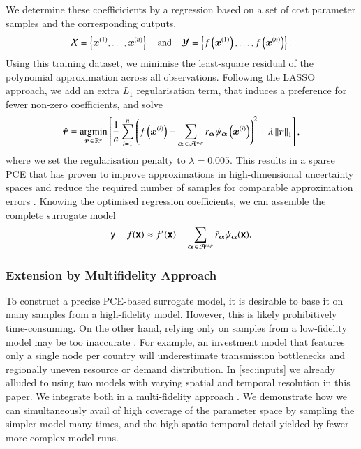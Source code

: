 We determine these coefficicients by a regression based on
a set of cost parameter samples
and the corresponding outputs,
\begin{equation}
    \mathcal{X} = \left\{ \bm x^{(1)},\dots,\bm x^{(n)} \right\} \quad\text{and}\quad 
    \mathcal{Y} = \left\{ f\left(\bm x^{(1)}\right),\dots,f\left(\bm x^{(n)}\right) \right\}.
\end{equation}
Using this training dataset, we minimise the least-square residual of the polynomial approximation across all observations.
Following the LASSO approach, we add an extra $L_1$ regularisation term,
that induces a preference for fewer non-zero coefficients, and solve
\begin{equation}
    \hat{\bm{r}} = \operatorname*{\arg\!\min}_{\bm{r} \,\in\, \mathbb{R}^q} \left[ \frac{1}{n} \sum_{i=1}^n \left(
        f\left(\bm x^{(i)}\right) - \sum_{{\bm{\alpha}} \,\in\, \mathcal{A}^{m,p}} r_{\bm{\alpha}} \psi_{\bm{\alpha}}\left(\bm x^{(i)}\right)
        \right)^2  + \lambda \left\lVert\bm{r}\right\rVert_1 \right],
        \label{eq:regression}
    \end{equation}
where we set the regularisation penalty to $\lambda=0.005$.
This results in a sparse PCE that has proven to
improve approximations in high-dimensional uncertainty spaces
and reduce the required number of samples for comparable approximation errors \cite{gratiet_metamodel-based_2015}.
Knowing the optimised regression coefficients, we can assemble the complete surrogate model
\begin{equation}
    \mathsf{y} = f(\boldsymbol{\mathsf{x}}) \approx f'(\boldsymbol{\mathsf{x}}) = \sum_{{\bm{\alpha}} \,\in\, \mathcal{A}^{m,p}} \hat{r}_{\bm{\alpha}} \psi_{\bm{\alpha}} (\boldsymbol{\mathsf{x}}).
\end{equation}

\subsubsection{Extension by Multifidelity Approach}
\label{sec:multifidelity}


To construct a precise PCE-based surrogate model, it is desirable to base it
on many samples from a high-fidelity model.
However, this is likely prohibitively time-consuming.
On the other hand, relying only on samples from a
low-fidelity model may be too inaccurate \cite{ng_multifidelity_2012}.
For example, an investment model that features only a single node per country
will underestimate transmission bottlenecks and regionally uneven resource or demand distribution.
In \cref{sec:inputs} we already alluded to using
two models with varying spatial and temporal resolution in this paper.
We integrate both in a multi-fidelity approach \cite{ng_multifidelity_2012,palar_multi-fidelity_2016}.
We demonstrate how we can
simultaneously avail of high coverage of the parameter space by sampling
the simpler model many times, and the high spatio-temporal detail yielded by fewer more complex model runs.


